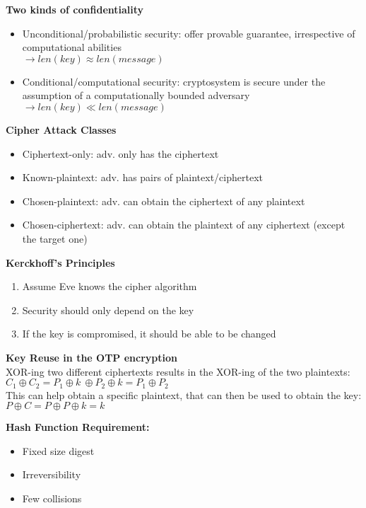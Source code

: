 \documentclass[10pt,letterpaper,landscape]{report}
\newcommand{\boxheight}{21.59cm}
\newcommand{\boxwidth}{8.85cm}
\begin{document}
\begin{small}
{\begin{minipage}[t][\boxheight][c]{\boxwidth}
	\textbf{Two kinds of confidentiality}
	\begin{itemize}
		\item Unconditional/probabilistic security: offer provable guarantee, irrespective of computational abilities\\
		$\rightarrow len(key) \approx len(message)$
		\item Conditional/computational security: cryptosystem is secure under the assumption of a computationally bounded adversary\\
		$\rightarrow len(key) \ll len(message) $
	\end{itemize}

	\textbf{Cipher Attack Classes}
	\begin{itemize}
		\item Ciphertext-only: adv. only has the ciphertext
		\item Known-plaintext: adv. has pairs of plaintext/ciphertext
		\item Chosen-plaintext: adv. can obtain the ciphertext of any plaintext
		\item Chosen-ciphertext: adv. can obtain the plaintext of any ciphertext (except the target one)
	\end{itemize}

	\textbf{Kerckhoff's Principles}
	\begin{enumerate}
		\item Assume Eve knows the cipher algorithm
		\item Security should only depend on the key
		\item If the key is compromised, it should be able to be changed
	\end{enumerate}

	\textbf{Key Reuse in the OTP encryption}\\
	XOR-ing two different ciphertexts results in the XOR-ing of the two plaintexts: 
	$C_1 \oplus C_2 = P_1 \oplus k\ \oplus P_2 \oplus k = P_1 \oplus P_2$\\
	This can help obtain a specific plaintext, that can then be used to obtain the key: $ P \oplus C = P \oplus P \oplus k = k$
	
	\textbf{Hash Function Requirement:}
	\begin{itemize}
		\item Fixed size digest
		\item Irreversibility
		\item Few collisions
	\end{itemize}


\end{minipage}}
\end{small}
\end{document}
